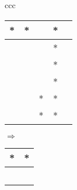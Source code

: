 \documentclass{article}
\begin{document}
\begin{tabular}{ccc}
%
\begin{tabular}{|c|c|c|c|c|}
\hline
*  & * &  & *   \\ \hline
  &  &  & *   \\ \hline
 &  &  &  *  \\ \hline
  &  &  & *   \\ \hline
  &  & * & *   \\ \hline
  &  & * & *   \\ \hline
\end{tabular}
%
 $\Longrightarrow$
%
\begin{tabular}{|c|c|}
\hline
 * &  *     \\ \hline
  &      \\ \hline
 &     \\ \hline
  &      \\ \hline
  &     \\ \hline
  &      \\ \hline
\end{tabular}


\end{tabular}
\end{document}
